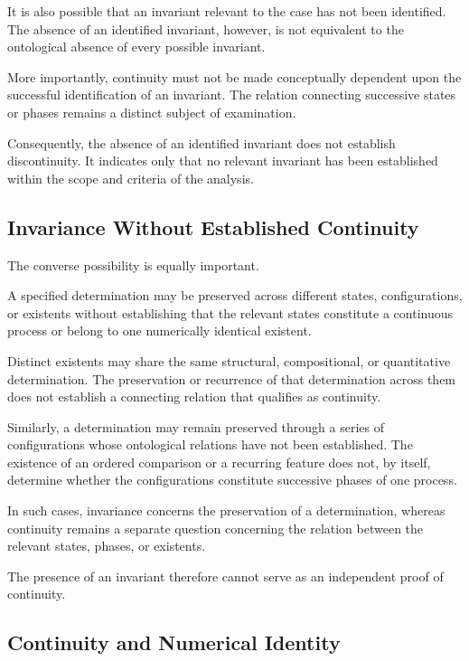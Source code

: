 

It is also possible that an invariant relevant
to the case has not been identified. The absence
of an identified invariant, however, is not
equivalent to the ontological absence of every
possible invariant.

More importantly, continuity must not be made
conceptually dependent upon the successful
identification of an invariant. The relation
connecting successive states or phases remains
a distinct subject of examination.

Consequently, the absence of an identified
invariant does not establish discontinuity.
It indicates only that no relevant invariant
has been established within the scope and
criteria of the analysis.

\subsection{Invariance Without Established Continuity}

The converse possibility is equally important.

A specified determination may be preserved
across different states, configurations, or
existents without establishing that the relevant
states constitute a continuous process or belong
to one numerically identical existent.

Distinct existents may share the same structural,
compositional, or quantitative determination.
The preservation or recurrence of that
determination across them does not establish
a connecting relation that qualifies as continuity.

Similarly, a determination may remain preserved
through a series of configurations whose
ontological relations have not been established.
The existence of an ordered comparison or a
recurring feature does not, by itself, determine
whether the configurations constitute successive
phases of one process.

In such cases, invariance concerns the preservation
of a determination, whereas continuity remains
a separate question concerning the relation
between the relevant states, phases, or existents.

The presence of an invariant therefore cannot
serve as an independent proof of continuity.

\subsection{Continuity and Numerical Identity}

